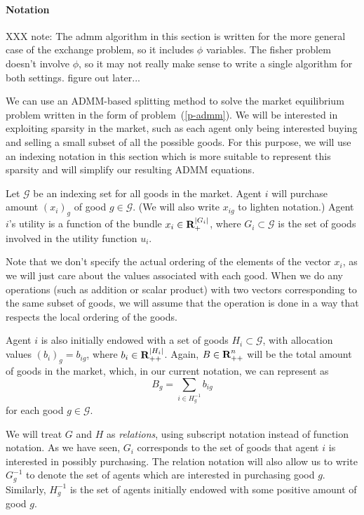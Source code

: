 \documentclass[12pt]{article}
\begin{document}
\paragraph{Notation}
XXX note: The admm algorithm in this section is written for the more general case of 
the exchange problem, so it includes $\phi$ variables.
The fisher problem doesn't involve $\phi$, so it may not really make sense
to write a single algorithm for both settings. figure out later...

We can use an ADMM-based splitting method \cite{boyd2011distributed} to
solve the market equilibrium problem written in the form of
problem~(\ref{p-admm}).
We will be interested in exploiting sparsity in the market, such
as each agent only being interested buying and selling a small subset 
of all the possible goods.
For this purpose, we will use an indexing notation in this section which is
more suitable to represent this sparsity and will simplify our resulting
ADMM equations.

Let $\mathcal{G}$ be an indexing set for all goods
in the market.
Agent $i$ will purchase amount $(x_i)_g$ of good $g \in \mathcal{G}$.
(We will also write $x_{ig}$ to lighten notation.)
Agent $i$'s utility is a function of the bundle $x_i \in {\mbox{\bf R}}_{+}^{|G_i|}$,
where $G_i \subset \mathcal{G}$ is the set of goods involved in the utility
function $u_i$.

Note that we don't specify the actual ordering of the elements
of the vector $x_i$, as we will just care about the values associated with
each good.
When we do any operations (such as addition or scalar product) with
two vectors corresponding to the same subset of goods, we will
assume that the operation is done in a way that respects the local ordering of
the goods.

Agent $i$ is also initially endowed with a set of goods
$H_i \subset \mathcal{G}$,
with allocation values $(b_i)_g = b_{ig}$, where $b_i \in {\mbox{\bf R}}_{++}^{|H_i|}$.
Again, $B \in {\mbox{\bf R}}^n_{++}$ will be the total amount of goods in the market, which, in our
current notation, we can represent as
\[
B_g = \sum\limits_{i \in H^{-1}_g} b_{ig}
\]
for each good $g \in \mathcal{G}$.

We will treat $G$ and $H$ as \emph{relations},
using subscript notation instead of function notation.
As we have seen, $G_i$ corresponds to the set of goods that agent $i$ is
interested
in possibly purchasing.
The relation notation will also allow us to
write $G^{-1}_g$ to denote the set of agents which are interested in
purchasing good $g$.
Similarly, $H^{-1}_g$ is the set of agents initially endowed with some
positive amount of good $g$.
\end{document}
